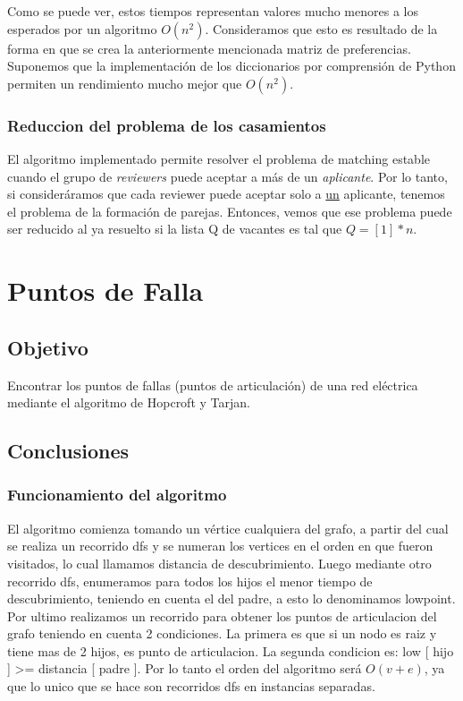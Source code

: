 \documentclass{article}
\begin{document}
                Como se puede ver, estos tiempos representan valores mucho menores a
                los esperados por un algoritmo $O(n^2)$. Consideramos que esto es
                resultado de la forma en que se crea la anteriormente mencionada
                matriz de preferencias. Suponemos que la implementación de los
                diccionarios por comprensión de Python permiten un rendimiento mucho
                mejor que $O(n^2)$.
            \subsubsection{Reduccion del problema de los casamientos}
                El algoritmo implementado permite resolver el problema de matching
                estable cuando el grupo de \emph{reviewers} puede aceptar a más de
                un \emph{aplicante}. Por lo tanto, si consideráramos que cada reviewer
                puede aceptar solo a \underline{un} aplicante, tenemos el problema
                de la formación de parejas. Entonces, vemos que ese problema
                puede ser reducido al ya resuelto si la lista Q de vacantes es tal
                que $Q = [1]*n$.

    \section{Puntos de Falla}
        \subsection{Objetivo}
            Encontrar los puntos de fallas (puntos de articulación) de una red eléctrica
            mediante el algoritmo de Hopcroft y Tarjan.
        \subsection{Conclusiones}
            \subsubsection{Funcionamiento del algoritmo}
                El algoritmo comienza tomando un vértice cualquiera del grafo, a partir
                del cual se realiza un recorrido dfs y se numeran los vertices en el orden
                en que fueron visitados, lo cual llamamos distancia de descubrimiento.
                Luego mediante otro recorrido dfs, enumeramos para todos los hijos el menor
                tiempo de descubrimiento, teniendo en cuenta el del padre, a esto lo denominamos
                lowpoint. Por ultimo realizamos un recorrido para obtener los puntos de articulacion
                del grafo teniendo en cuenta 2 condiciones. La primera es que si un nodo es raiz
                y tiene mas de 2 hijos, es punto de articulacion. La segunda condicion es:
                low [ hijo ] >= distancia [ padre ].
                Por lo tanto el orden del algoritmo será $O(v+e)$, ya que lo unico que se hace
                son recorridos dfs en instancias separadas.
\end{document}
